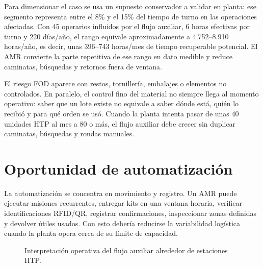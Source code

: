 Para dimensionar el caso se usa un supuesto conservador a validar en planta: ese segmento representa entre el 8\% y el 15\% del tiempo de turno en las operaciones afectadas. Con 45 operarios influidos por el flujo auxiliar, 6 horas efectivas por turno y 220 días/año, el rango equivale aproximadamente a 4.752--8.910 horas/año, es decir, unas 396--743 horas/mes de tiempo recuperable potencial. El AMR convierte la parte repetitiva de ese rango en dato medible y reduce caminatas, búsquedas y retornos fuera de ventana.

El riesgo FOD aparece con restos, tornillería, embalajes o elementos no controlados. En paralelo, el control fino del material no siempre llega al momento operativo: saber que un lote existe no equivale a saber dónde está, quién lo recibió y para qué orden se usó. Cuando la planta intenta pasar de unas 40 unidades HTP al mes a 80 o más, el flujo auxiliar debe crecer sin duplicar caminatas, búsquedas y rondas manuales.

\section{Oportunidad de automatización}

La automatización se concentra en movimiento y registro. Un AMR puede ejecutar misiones recurrentes, entregar kits en una ventana horaria, verificar identificaciones RFID/QR, registrar confirmaciones, inspeccionar zonas definidas y devolver útiles usados. Con esto debería reducirse la variabilidad logística cuando la planta opera cerca de su límite de capacidad.

\begin{figure}[H]
\centering

\caption{Interpretación operativa del flujo auxiliar alrededor de estaciones HTP.}
\label{fig:layout-concept}
\end{figure}
